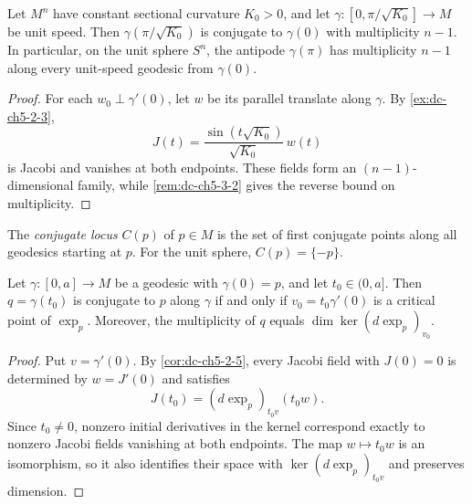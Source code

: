 \begin{example}
  \label{ex:dc-ch5-3-3}
  \leanok
  Let $M^n$ have constant sectional curvature $K_0>0$, and let
  $\gamma:[0,\pi/\sqrt{K_0}]\to M$ be unit speed. Then
  $\gamma(\pi/\sqrt{K_0})$ is conjugate to $\gamma(0)$ with multiplicity $n-1$.
  In particular, on the unit sphere $S^n$, the antipode $\gamma(\pi)$ has
  multiplicity $n-1$ along every unit-speed geodesic from $\gamma(0)$.
\end{example}
\begin{proof}

  \sketch
  For each $w_0\perp\gamma'(0)$, let $w$ be its parallel translate along
  $\gamma$. By \cref{ex:dc-ch5-2-3},
  $$
  J(t)=\frac{\sin(t\sqrt{K_0})}{\sqrt{K_0}}\,w(t)
  $$
  is Jacobi and vanishes at both endpoints. These fields form an
  $(n-1)$-dimensional family, while \cref{rem:dc-ch5-3-2} gives the reverse
  bound on multiplicity.
\end{proof}

\begin{definition}
  \label{def:dc-ch5-3-4}
\leanok
  The \emph{conjugate locus} $C(p)$ of $p\in M$ is the set of first conjugate
  points along all geodesics starting at $p$. For the unit sphere,
  $C(p)=\{-p\}$.
\end{definition}

\begin{proposition}
  \label{prop:dc-ch5-3-5}
  \leanok
  Let $\gamma:[0,a]\to M$ be a geodesic with $\gamma(0)=p$, and let
  $t_0\in(0,a]$. Then $q=\gamma(t_0)$ is conjugate to $p$ along $\gamma$ if and
  only if $v_0=t_0\gamma'(0)$ is a critical point of $\exp_p$. Moreover, the
  multiplicity of $q$ equals $\dim\ker(d\exp_p)_{v_0}$.
\end{proposition}
\begin{proof}
  \sketch
  Put $v=\gamma'(0)$. By \cref{cor:dc-ch5-2-5}, every Jacobi field with
  $J(0)=0$ is determined by $w=J'(0)$ and satisfies
  $$
  J(t_0)=(d\exp_p)_{t_0v}(t_0w).
  $$
  Since $t_0\ne0$, nonzero initial derivatives in the kernel correspond exactly
  to nonzero Jacobi fields vanishing at both endpoints. The map
  $w\mapsto t_0w$ is an isomorphism, so it also identifies their space with
  $\ker(d\exp_p)_{t_0v}$ and preserves dimension.
\end{proof}

